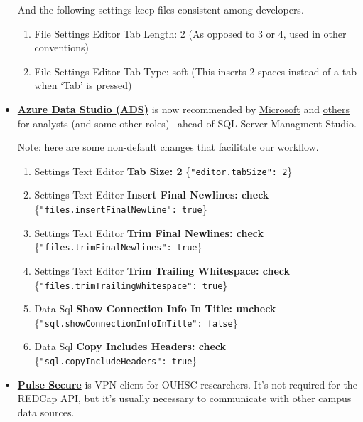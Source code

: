 \documentclass[
]{book}
\providecommand{\tightlist}{%
  \setlength{\itemsep}{0pt}\setlength{\parskip}{0pt}}
\begin{document}
\begin{itemize}
  And the following settings keep files consistent among developers.

  \begin{enumerate}
  \def\labelenumi{\arabic{enumi}.}
  \tightlist
  \item
    File \textbar{} Settings \textbar{} Editor \textbar{} Tab Length: 2 (As opposed to 3 or 4, used in other conventions)
  \item
    File \textbar{} Settings \textbar{} Editor \textbar{} Tab Type: soft (This inserts 2 spaces instead of a tab when `Tab' is pressed)
  \end{enumerate}
\item
  \textbf{\href{https://docs.microsoft.com/en-us/sql/azure-data-studio/download}{Azure Data Studio (ADS)}} is now recommended by \href{https://cloudblogs.microsoft.com/sqlserver/2018/09/25/azure-data-studio-for-sql-server/}{Microsoft} and \href{https://www.brentozar.com/archive/2019/04/if-you-work-with-sql-server-youre-really-lucky/}{others} for analysts (and some other roles) --ahead of SQL Server Managment Studio.

  Note: here are some non-default changes that facilitate our workflow.

  \begin{enumerate}
  \def\labelenumi{\arabic{enumi}.}
  \tightlist
  \item
    Settings \textbar{} Text Editor \textbar{} \textbf{Tab Size: 2} \{\texttt{"editor.tabSize":\ 2}\}
  \item
    Settings \textbar{} Text Editor \textbar{} \textbf{Insert Final Newlines: check} \{\texttt{"files.insertFinalNewline":\ true}\}
  \item
    Settings \textbar{} Text Editor \textbar{} \textbf{Trim Final Newlines: check} \{\texttt{"files.trimFinalNewlines":\ true}\}
  \item
    Settings \textbar{} Text Editor \textbar{} \textbf{Trim Trailing Whitespace: check} \{\texttt{"files.trimTrailingWhitespace":\ true}\}
  \item
    Data \textbar{} Sql \textbar{} \textbf{Show Connection Info In Title: uncheck} \{\texttt{"sql.showConnectionInfoInTitle":\ false}\}
  \item
    Data \textbar{} Sql \textbar{} \textbf{Copy Includes Headers: check} \{\texttt{"sql.copyIncludeHeaders":\ true}\}
  \end{enumerate}
\item
  \textbf{\href{https://connect.ouhsc.edu}{Pulse Secure}} is VPN client for OUHSC researchers. It's not required for the REDCap API, but it's usually necessary to communicate with other campus data sources.
\end{itemize}
\end{document}
